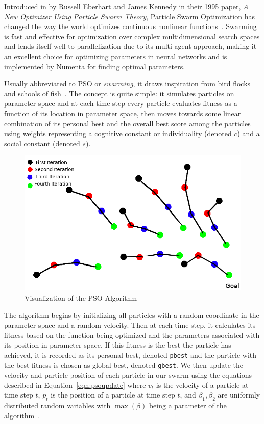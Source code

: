 \documentclass[oneside,12pt,openany]{book}
\begin{document}
	Introduced in by Russell Eberhart and James Kennedy in their 1995 paper, \textit{A New Optimizer Using Particle Swarm Theory}, Particle Swarm Optimization has changed the way the world optimizes continuous nonlinear functions~\cite{PSOReview}. Swarming is fast and effective for optimization over complex multidimensional search spaces and lends itself well to parallelization due to its multi-agent approach, making it an excellent choice for optimizing parameters in neural networks and is implemented by Numenta for finding optimal parameters.
	
	Usually abbreviated to PSO or \textit{swarming}, it draws inspiration from bird flocks and schools of fish~\cite{Eberhart}. The concept is quite simple: it simulates particles on parameter space and at each time-step every particle evaluates fitness as a function of its location in parameter space, then moves towards some linear combination of its personal best and the overall best score among the particles using weights representing a cognitive constant or individuality (denoted $c$) and a social constant (denoted $s$).
	
	\begin{figure}[!ht]
		\centering
		\includegraphics[width=.7\linewidth]{images/PSOVisual.png}
		\caption{Visualization of the PSO Algorithm}
		\label{fig:PSOVisual}
	\end{figure}
	
	The algorithm begins by initializing all particles with a random coordinate in the parameter space and a random velocity. Then at each time step, it calculates its fitness based on the function being optimized and the parameters associated with its position in parameter space. If this fitness is the best the particle has achieved, it is recorded as its personal best, denoted \texttt{pbest} and the particle with the best fitness is chosen as global best, denoted \texttt{gbest}. We then update the velocity and particle position of each particle in our swarm using the equations described in Equation~\eqref{eqn:psoupdate} where $v_{t}$ is the velocity of a particle at time step $t$, $p_{t}$ is the position of a particle at time step $t$, and $\beta_{1}, \beta_{2}$ are uniformly distributed random variables with $\max(\beta)$ being a parameter of the algorithm~\cite{PSOReview}.
	
\end{document}
